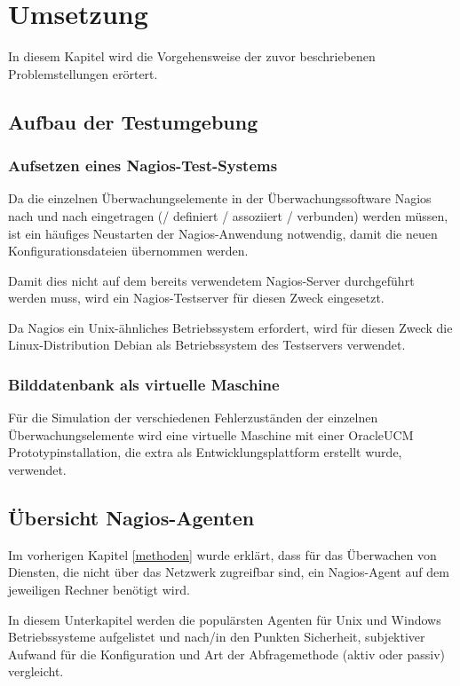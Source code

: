 \section{Umsetzung}
In diesem Kapitel wird die Vorgehensweise der zuvor beschriebenen Problemstellungen erörtert.

\subsection{Aufbau der Testumgebung}


\subsubsection{Aufsetzen eines Nagios-Test-Systems}
Da die einzelnen Überwachungselemente in der Überwachungssoftware Nagios nach und nach eingetragen (/ definiert / assoziiert / verbunden) werden müssen, ist ein häufiges Neustarten der Nagios-Anwendung notwendig, damit die neuen Konfigurationsdateien übernommen werden.

Damit dies nicht auf dem bereits verwendetem Nagios-Server durchgeführt werden muss, wird ein Nagios-Testserver für diesen Zweck eingesetzt.

Da Nagios ein Unix-ähnliches Betriebssystem erfordert, wird für diesen Zweck die Linux-Distribution Debian als Betriebssystem des Testservers verwendet.

\subsubsection{Bilddatenbank als virtuelle Maschine}
Für die Simulation der verschiedenen Fehlerzuständen der einzelnen Überwachungselemente wird eine virtuelle Maschine mit einer \gls{OracleUCM} Prototypinstallation, die extra als Entwicklungsplattform erstellt wurde, verwendet.


\subsection{Übersicht Nagios-Agenten}
Im vorherigen Kapitel \ref{methoden} wurde erklärt, dass für das Überwachen von Diensten, die nicht über das Netzwerk zugreifbar sind, ein Nagios-Agent auf dem jeweiligen Rechner benötigt wird.

In diesem Unterkapitel werden die populärsten Agenten für Unix und Windows Betriebssysteme aufgelistet und nach/in den Punkten Sicherheit, subjektiver Aufwand für die Konfiguration und Art der Abfragemethode (aktiv oder passiv) vergleicht.

